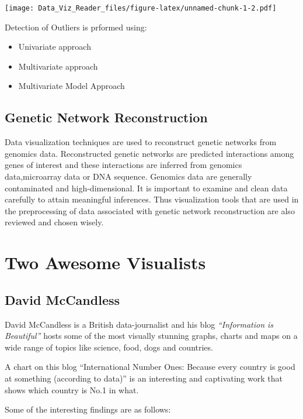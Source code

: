 \documentclass[]{book}
\providecommand{\tightlist}{%
  \setlength{\itemsep}{0pt}\setlength{\parskip}{0pt}}
\theoremstyle{definition}
\theoremstyle{definition}
\theoremstyle{definition}
\theoremstyle{remark}
\begin{document}
\texttt{[image: Data\_Viz\_Reader\_files/figure-latex/unnamed-chunk-1-2.pdf]}

Detection of Outliers is prformed using:

\begin{itemize}
\tightlist
\item
  Univariate approach
\item
  Multivariate approach
\item
  Multivariate Model Approach
\end{itemize}

\subsection{Genetic Network
Reconstruction}\label{genetic-network-reconstruction}

Data visualization techniques are used to reconstruct genetic networks
from genomics data. Reconstructed genetic networks are predicted
interactions among genes of interest and these interactions are inferred
from genomics data,microarray data or DNA sequence. Genomics data are
generally contaminated and high-dimensional. It is important to examine
and clean data carefully to attain meaningful inferences. Thus
visualization tools that are used in the preprocessing of data
associated with genetic network reconstruction are also reviewed and
chosen wisely.

\section{Two Awesome Visualists}\label{two-awesome-visualists}

\subsection{David McCandless}\label{david-mccandless}

David McCandless is a British data-journalist and his blog
\emph{``Information is Beautiful''} \citep{info_beautiful} hosts some of
the most visually stunning graphs, charts and maps on a wide range of
topics like science, food, dogs and countries.

A chart on this blog ``International Number Ones: Because every country
is good at something (according to data)'' is an interesting and
captivating work that shows which country is No.1 in what.
\citep{country_chart}

Some of the interesting findings are as follows:
\end{document}

